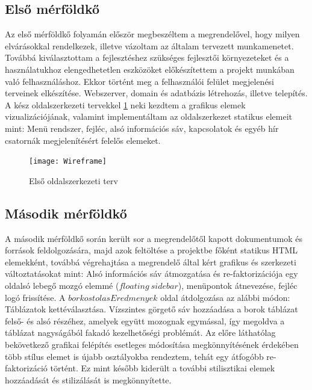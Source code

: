 \documentclass[12pt]{report}
\theoremstyle{definition}
\begin{document}
	\subsection{Első mérföldkő}Az első mérföldkő folyamán először megbeszéltem a megrendelővel, hogy milyen elvárásokkal rendelkezek, illetve vázoltam az általam tervezett munkamenetet. Továbbá kiválasztottam a fejlesztéshez szükséges fejlesztői környezeteket és a használatukhoz elengedhetetlen eszközöket előkészítettem a projekt munkában való felhasználáshoz. Ekkor történt meg a felhasználói felület megjelenési terveinek elkészítése. Webszerver, domain és adatbázis létrehozás, illetve telepítés. A kész oldalszerkezeti tervekkel \ref{fig:Wireframe} neki kezdtem a grafikus elemek vizualizációjának, valamint implementáltam az oldalszerkezet statikus elemeit mint: Menü rendszer, fejléc, alsó információs sáv, kapcsolatok és egyéb hír csatornák megjelenítésért felelős elemeket.
	
	\begin{figure}[h]
		\centering
		\texttt{[image: Wireframe]}
		\caption[Első oldalszerkezeti terv]{Első oldalszerkezeti terv \label{fig:Wireframe}}
	\end{figure}
	
	\subsection{Második mérföldkő}A második mérföldkő során került sor a megrendelőtől kapott dokumentumok és források feldolgozására, majd azok feltöltése a projektbe főként statikus HTML elemekként, továbbá végrehajtása a megrendelő által kért grafikus és szerkezeti változtatásokat mint: Alsó információs sáv átmozgatása és re-faktorizációja egy oldalsó lebegő mozgó elemmé ($floating\ sidebar$), menüpontok átnevezése, fejléc logó frissítése. \linebreak A $borkostolasEredmenyek$ oldal átdolgozása az alábbi módon: Táblázatok  kettéválasztása. Vízszintes görgető sáv hozzáadása a borok táblázat felső- és alsó részéhez, amelyek együtt mozognak egymással, így megoldva a táblázat nagyságából fakadó kezelhetőségi problémát. Az előre láthatólag bekövetkező grafikai felépítés esetleges módosítása megkönnyítésének érdekében több stílus elemet is újabb osztályokba rendeztem, tehát egy átfogóbb re-faktorizáció történt. Ez mint később kiderült a további stilisztikai elemek hozzáadását és stilizálását is megkönnyítette.
	
\end{document}
